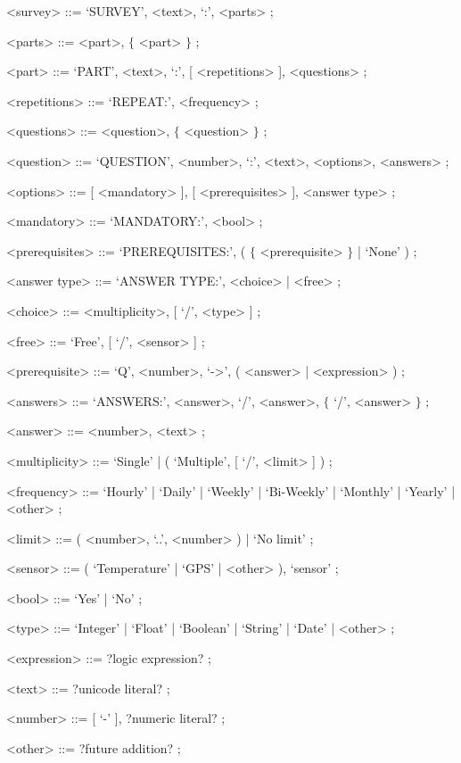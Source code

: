 \begin{grammar}
      <survey> ::= `SURVEY', <text>, `:', <parts> ;
      
      <parts> ::= <part>, $\lbrace$ <part> $\rbrace$ ; 
       
      <part> ::= `PART', <text>, `:', {[} <repetitions> {]}, <questions> ;
      
      <repetitions> ::= `REPEAT:', <frequency> ;
      
      <questions> ::= <question>, $\lbrace$ <question> $\rbrace$ ;
      
      <question> ::= `QUESTION', <number>, `:', <text>, <options>, <answers> ;
      
      <options> ::= {[} <mandatory> {]}, {[} <prerequisites> {]}, <answer type> ;
      
      <mandatory> ::= `MANDATORY:', <bool> ;
      
      <prerequisites> ::= `PREREQUISITES:', ( $\lbrace$ <prerequisite> $\rbrace$ | `None' ) ;
      
      <answer type> ::= `ANSWER TYPE:', <choice> | <free> ;
      
      <choice> ::= <multiplicity>, {[} `/', <type> {]} ;
      
      <free> ::= `Free', {[} `/', <sensor> {]} ;
      
      <prerequisite> ::= `Q', <number>, `->', ( <answer> | <expression> ) ;
      
      <answers> ::= `ANSWERS:', <answer>, `/', <answer>, $\lbrace$ `/', <answer> $\rbrace$ ;
      
      <answer> ::= <number>, <text> ;
         
      <multiplicity> ::= `Single' | ( `Multiple', {[} `/', <limit> {]} ) ;
      
      <frequency> ::= `Hourly' | `Daily' | `Weekly' | `Bi-Weekly' | `Monthly' | `Yearly' | <other> ;
      
      <limit> ::= ( <number>, `..', <number> ) | `No limit' ;
      
      <sensor> ::= ( `Temperature' | `GPS' | <other> ), `sensor' ;
      
      <bool> ::= `Yes' | `No' ;
      
      <type> ::= `Integer' | `Float' | `Boolean' | `String' | `Date' | <other> ;
      
      <expression> ::= ?logic expression? ;
      
      <text> ::= ?unicode literal? ;
      
      <number> ::= {[} `-' {]}, ?numeric literal? ;
      
      <other> ::= ?future addition? ;
\end{grammar}

